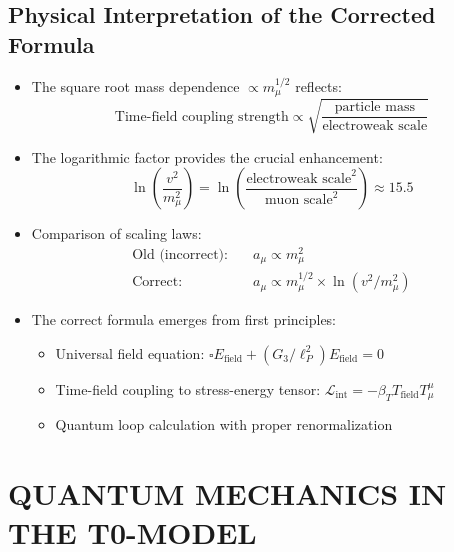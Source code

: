 \documentclass[12pt,a4paper]{article}
\begin{document}
\subsection{Physical Interpretation of the Corrected Formula}
\begin{itemize}
	\item The square root mass dependence $\propto m_\mu^{1/2}$ reflects:
	\begin{equation}
		\text{Time-field coupling strength} \propto \sqrt{\frac{\text{particle mass}}{\text{electroweak scale}}}
	\end{equation}
	
	\item The logarithmic factor provides the crucial enhancement:
	\begin{equation}
		\ln\left(\frac{v^2}{m_\mu^2}\right) = \ln\left(\frac{\text{electroweak scale}^2}{\text{muon scale}^2}\right) \approx 15.5
	\end{equation}
	
	\item Comparison of scaling laws:
	\begin{align}
		\text{Old (incorrect):} &\quad a_\mu \propto m_\mu^2 \\
		\text{Correct:} &\quad a_\mu \propto m_\mu^{1/2} \times \ln(v^2/m_\mu^2)
	\end{align}
	
	\item The correct formula emerges from first principles:
	\begin{itemize}
		\item Universal field equation: $\square E_{\text{field}} + (G_3/\ell_P^2) E_{\text{field}} = 0$
		\item Time-field coupling to stress-energy tensor: $\mathcal{L}_{\text{int}} = -\beta_T T_{\text{field}} T^\mu_\mu$
		\item Quantum loop calculation with proper renormalization
	\end{itemize}
\end{itemize}
	\section{QUANTUM MECHANICS IN THE T0-MODEL}
	
\end{document}
